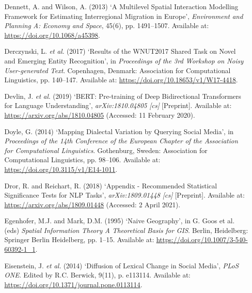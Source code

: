 \documentclass[
  letterpaper,
  11pt,
  english,
  onehalfspacing,
  headsepline]{MastersDoctoralThesis}
\newlength{\cslhangindent}
\newlength{\cslentryspacingunit} %
\newenvironment{CSLReferences}[2] %
 {%
  \setlength{\parindent}{0pt}
  \ifodd #1
  \let\oldpar\par
  \def\par{\hangindent=\cslhangindent\oldpar}
  \fi
  \setlength{\parskip}{#2\cslentryspacingunit}
 }%
 {}
\begin{document}
\begin{CSLReferences}{0}{0}
\leavevmode{}%
Dennett, A. and Wilson, A. (2013) {`A {Multilevel Spatial Interaction
Modelling Framework} for {Estimating Interregional Migration} in
{Europe}'}, \emph{Environment and Planning A: Economy and Space}, 45(6),
pp. 1491--1507. Available at: \url{https://doi.org/10.1068/a45398}.

\leavevmode{}%
Derczynski, L. \emph{et al.} (2017) {`Results of the {WNUT2017 Shared
Task} on {Novel} and {Emerging Entity Recognition}'}, in
\emph{Proceedings of the 3rd {Workshop} on {Noisy User-generated Text}}.
{Copenhagen, Denmark}: {Association for Computational Linguistics}, pp.
140--147. Available at: \url{https://doi.org/10.18653/v1/W17-4418}.

\leavevmode{}%
Devlin, J. \emph{et al.} (2019) {`{BERT}: {Pre-training} of {Deep
Bidirectional Transformers} for {Language Understanding}'},
\emph{arXiv:1810.04805 {[}cs{]}} {[}Preprint{]}. Available at:
\url{https://arxiv.org/abs/1810.04805} (Accessed: 11 February 2020).

\leavevmode{}%
Doyle, G. (2014) {`Mapping {Dialectal Variation} by {Querying Social
Media}'}, in \emph{Proceedings of the 14th {Conference} of the {European
Chapter} of the {Association} for {Computational Linguistics}}.
{Gothenburg, Sweden}: {Association for Computational Linguistics}, pp.
98--106. Available at: \url{https://doi.org/10.3115/v1/E14-1011}.

\leavevmode{}%
Dror, R. and Reichart, R. (2018) {`Appendix - {Recommended Statistical
Significance Tests} for {NLP Tasks}'}, \emph{arXiv:1809.01448 {[}cs{]}}
{[}Preprint{]}. Available at: \url{https://arxiv.org/abs/1809.01448}
(Accessed: 2 April 2021).

\leavevmode{}%
Egenhofer, M.J. and Mark, D.M. (1995) {`Naive {Geography}'}, in G. Goos
et al. (eds) \emph{Spatial {Information Theory A Theoretical Basis} for
{GIS}}. {Berlin, Heidelberg}: {Springer Berlin Heidelberg}, pp. 1--15.
Available at: \url{https://doi.org/10.1007/3-540-60392-1_1}.

\leavevmode{}%
Eisenstein, J. \emph{et al.} (2014) {`Diffusion of {Lexical Change} in
{Social Media}'}, \emph{PLoS ONE}. Edited by R.C. Berwick, 9(11), p.
e113114. Available at:
\url{https://doi.org/10.1371/journal.pone.0113114}.


\end{CSLReferences}
\end{document}
